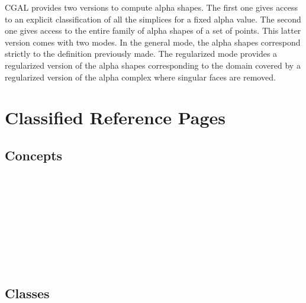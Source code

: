 CGAL provides two versions to compute alpha shapes. 
The first one gives access to an explicit classification of all the simplices for a fixed alpha value.
The second one gives access to the entire family of alpha shapes of a set of points.
This latter version comes with two modes. In the general mode,
the alpha shapes correspond strictly to the definition previously made.
The regularized mode provides a regularized version of the alpha shapes
corresponding to the domain covered by a regularized version
of the alpha complex where singular faces are removed.


\section{Classified Reference Pages}

\subsection*{Concepts}

\\
 \\
\\
\\
\\
 \\
\\
\\


\subsection*{Classes}
 \\
\\
\\

\\
\\
